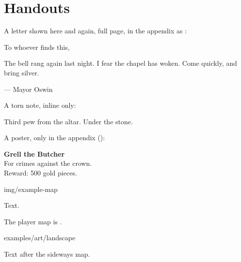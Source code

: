 \documentclass[letterpaper,twoside,twocolumn,openany,nodeprecatedcode]{dndbook}
\begin{document}
\tableofcontents
\DndListOfHandouts

\chapter{Handouts}

A letter shown here and again, full page, in the appendix as :

\begin{DndHandout}[style=letter, title={The Mayor's Letter}, label=mayor, appendix]
  To whoever finds this,

  The bell rang again last night. I fear the chapel has woken. Come quickly, and bring silver.

  \hfill --- Mayor Oswin
\end{DndHandout}

A torn note, inline only:

\begin{DndHandout}[style=note, title={Scrap of Paper}, label=scrap]
  Third pew from the altar. Under the stone.
\end{DndHandout}

A poster, only in the appendix ():

\begin{DndHandout}[style=poster, title=Wanted, label=wanted, art=examples/art/chapter, inline=false, appendix]
  \textbf{Grell the Butcher}\\
  For crimes against the crown.\\
  Reward: 500 gold pieces.
\end{DndHandout}

\begin{DndMap}[caption=The Ruins, label=ruins]{img/example-map}
\end{DndMap}

Text.


The player map is .

\begin{DndMap}[caption=The Coast, label=coast, placement=sideways]{examples/art/landscape}
\end{DndMap}

Text after the sideways map.

\appendix
\DndHandoutAppendix
\end{document}
